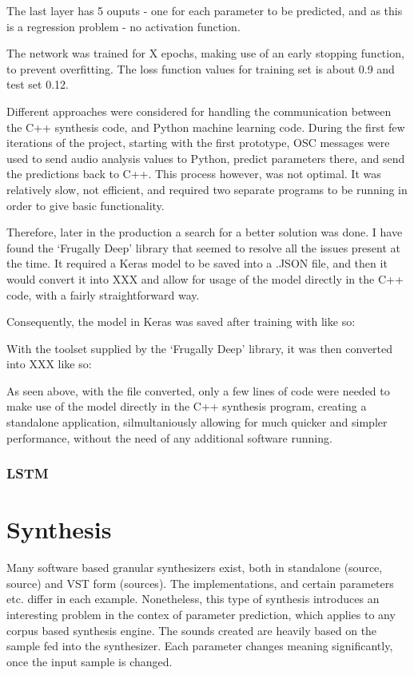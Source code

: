 The last layer has 5 ouputs - one for each parameter to be predicted,
and as this is a regression problem - no activation function.

The network was trained for X epochs, making use of an early stopping
function, to prevent overfitting. The loss function values for training
set is about 0.9 and test set 0.12.

Different approaches were considered for handling the communication
between the C++ synthesis code, and Python machine learning
code. During the first few iterations of the project, starting with
the first prototype, OSC messages were used to send audio analysis
values to Python, predict parameters there, and send the predictions
back to C++. This process however, was not optimal. It was relatively
slow, not efficient, and required two separate programs to be running
in order to give basic functionality.

Therefore, later in the production a search for a better solution was
done. I have found the `Frugally Deep' library that seemed to resolve all the
issues present at the time. It required a Keras model to be saved into
a .JSON file, and then it would convert it into XXX and allow for
usage of the model directly in the C++ code, with a fairly
straightforward way. 

Consequently, the model in Keras was saved after training with like so:

With the toolset supplied by the `Frugally Deep' library, it was then
converted into XXX like so:

As seen above, with the file converted, only a few lines of code were
needed to make use of the model directly in the C++ synthesis program,
creating a standalone application, silmultaniously allowing for much
quicker and simpler performance, without the need of any additional
software running.

\subsubsection{LSTM}

\section{Synthesis}
Many software based granular synthesizers exist, both in standalone
(source, source) and VST form (sources). The implementations, and
certain parameters etc. differ in each example. Nonetheless, this type
of synthesis introduces an interesting problem in the contex of
parameter prediction, which applies to any corpus based synthesis
engine. The sounds created are heavily based on the sample fed into
the synthesizer. Each parameter changes meaning significantly, once
the input sample is changed. 


